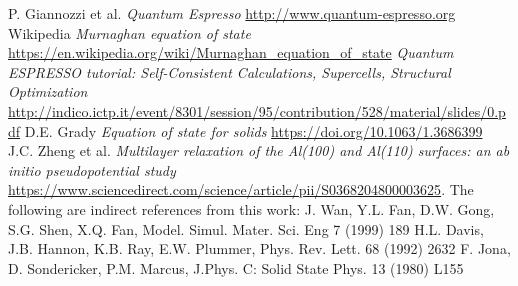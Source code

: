 \documentclass[a4paper, 11pt]{article}
\begin{document}
\begin{thebibliography}{100}
   P. Giannozzi et al. \emph{Quantum Espresso}  \url{http://www.quantum-espresso.org}
   Wikipedia \emph{Murnaghan equation of state}  \url{https://en.wikipedia.org/wiki/Murnaghan_equation_of_state}
    \emph{Quantum ESPRESSO tutorial:  Self-Consistent Calculations, Supercells, Structural Optimization}  \url{http://indico.ictp.it/event/8301/session/95/contribution/528/material/slides/0.pdf}
   D.E. Grady \emph{Equation of state for solids}  \url{https://doi.org/10.1063/1.3686399}
   J.C. Zheng et al. \emph{Multilayer  relaxation  of  the  Al(100)  and  Al(110)  surfaces: an  ab  initio  pseudopotential  study}  \url{https://www.sciencedirect.com/science/article/pii/S0368204800003625}.
  The following are indirect references from this work:
   J. Wan, Y.L. Fan, D.W. Gong, S.G. Shen, X.Q. Fan, Model. Simul. Mater. Sci. Eng 7 (1999) 189
   H.L. Davis, J.B. Hannon, K.B. Ray, E.W. Plummer, Phys. Rev. Lett. 68 (1992) 2632
   F. Jona, D. Sondericker, P.M. Marcus, J.Phys. C: Solid State Phys. 13 (1980) L155
\end{thebibliography}
\end{document}
